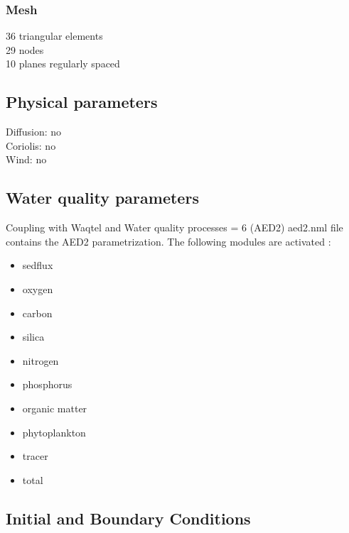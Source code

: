 \subsubsection{Mesh}
%
36 triangular elements\\
29 nodes\\
10 planes regularly spaced
%
%
%
%
\subsection{Physical parameters}
%
Diffusion: no\\
Coriolis: no\\
Wind: no
%
%
%
%
%
\subsection{Water quality parameters}
Coupling with Waqtel and Water quality processes = 6 (AED2)
aed2.nml file contains the AED2 parametrization. The following modules are activated :
\begin{itemize}
	\item sedflux
	\item oxygen
	\item carbon
	\item silica
	\item nitrogen
	\item phosphorus
	\item organic matter
	\item phytoplankton
	\item tracer
	\item total
\end{itemize}
%
\subsection{Initial and Boundary Conditions}
%

